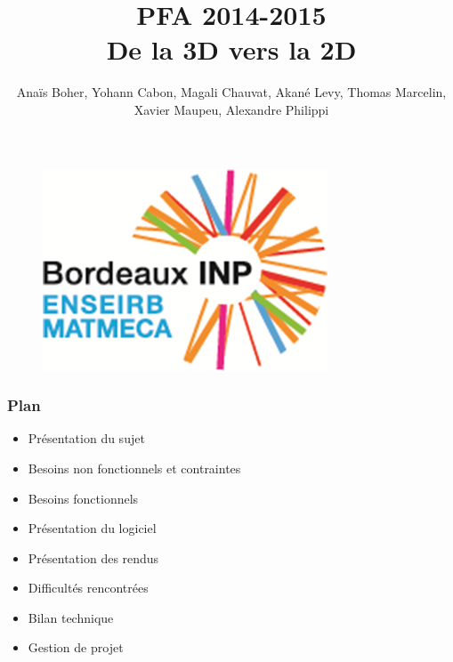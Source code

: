 \documentclass{beamer}
\title[PFA 2014-2015]{PFA 2014-2015 \\ \huge De la 3D vers la 2D} %
\author{Anaïs Boher, Yohann Cabon, Magali Chauvat, Akané Levy, Thomas Marcelin, Xavier Maupeu, Alexandre Philippi}
\institute[Enseirb-Matmeca] %
{École Nationale Supérieure d'Électronique, Informatique, Télécommunications, Mathématique et Mécanique de Bordeaux
}
\date{} %
\begin{document}
\graphicspath{{./images/}{.}}
\begin{frame}
\titlepage %
\begin{figure}[b]
\includegraphics[scale=0.4]{logo.png}
\end{figure}
\end{frame}
\begin{frame}
\frametitle{Plan}
\begin{itemize}[label=$\bullet$]
  \item Présentation du sujet
  \item Besoins non fonctionnels et contraintes
  \item Besoins fonctionnels
  \item Présentation du logiciel
  \item Présentation des rendus
  \item Difficultés rencontrées
  \item Bilan technique 
  \item Gestion de projet 
\end{itemize}
\end{frame}

\end{document}
